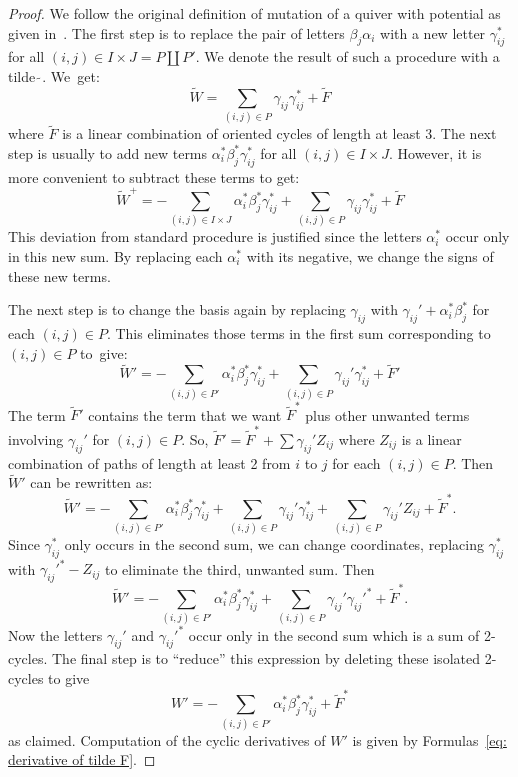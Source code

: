 \documentclass[10pt]{amsart}
\theoremstyle{definition}
\begin{document}
\begin{proof}
We follow the original definition of mutation of a quiver with potential as given in~\cite{DWZ1}. The first step is to replace the pair of letters $\beta_j\alpha_i$ with a new letter $\gamma_{ij}^\ast$ for all $(i,j)\in I\times J=P\coprod P'$. We denote the result of such a procedure with a tilde $\widetilde\,$. We~get:
\[
	\widetilde W= \sum_{(i,j)\in P} \gamma_{ij}\gamma_{ij}^\ast + \widetilde F
\]
where $\widetilde F$ is a linear combination of oriented cycles of length at least 3. The next step is usually to add new terms $\alpha_i^\ast\beta_j^\ast\gamma_{ij}^\ast$ for all $(i,j)\in I\times J$. However, it is more convenient to subtract these terms to get:
\[
	\widetilde W^+=-\sum_{(i,j)\in I\times J} \alpha_i^\ast\beta_j^\ast\gamma_{ij}^\ast+ \sum_{(i,j)\in P} \gamma_{ij}\gamma_{ij}^\ast + \widetilde F
\]
This deviation from standard procedure is justified since the letters $\alpha_i^\ast$ occur only in this new sum. By replacing each $\alpha_i^\ast$ with its negative, we change the signs of these new terms.

The next step is to change the basis again by replacing $\gamma_{ij}$ with $\gamma_{ij}'+\alpha_i^\ast\beta_j^\ast$ for each $(i,j)\in P$. This eliminates those terms in the first sum corresponding to $(i,j)\in P$ to~give:
\[
	\widetilde W'=-\sum_{(i,j)\in P'} \alpha_i^\ast\beta_j^\ast\gamma_{ij}^\ast+ \sum_{(i,j)\in P} \gamma_{ij}'\gamma_{ij}^\ast + \widetilde F'
\]
The term $\widetilde F'$ contains the term that we want $\widetilde F^\ast$ plus other unwanted terms involving $\gamma_{ij}'$ for $(i,j)\in P$. So, $\widetilde F'=\widetilde F^\ast+\sum \gamma_{ij}'Z_{ij}$ where $Z_{ij}$ is a linear combination of paths of length at least 2 from $i$ to $j$ for each $(i,j)\in P$. Then $\widetilde W'$ can be rewritten as:
\[
	\widetilde W'=-\sum_{(i,j)\in P'} \alpha_i^\ast\beta_j^\ast\gamma_{ij}^\ast+ \sum_{(i,j)\in P} \gamma_{ij}'\gamma_{ij}^\ast+\sum_{(i,j)\in P} \gamma_{ij}'Z_{ij} + \widetilde F^\ast.
\]
Since $\gamma_{ij}^\ast$ only occurs in the second sum, we can change coordinates, replacing $\gamma_{ij}^\ast$ with $\gamma_{ij}'^{\ast}-Z_{ij}$ to eliminate the third, unwanted sum. Then
\[
	\widetilde W'=-\sum_{(i,j)\in P'} \alpha_i^\ast\beta_j^\ast\gamma_{ij}^\ast+ \sum_{(i,j)\in P} \gamma_{ij}'\gamma_{ij}'^\ast+ \widetilde F^\ast.
\]
Now the letters $\gamma_{ij}'$ and $\gamma_{ij}'^\ast$ occur only in the second sum which is a sum of 2-cycles. The final step is to ``reduce'' this expression by deleting these isolated 2-cycles to give
\[
	 W'=-\sum_{(i,j)\in P'} \alpha_i^\ast\beta_j^\ast\gamma_{ij}^\ast+  \widetilde F^\ast
\]
as claimed. Computation of the cyclic derivatives of $W'$ is given by Formulas~\ref{eq: derivative of tilde F}.
\end{proof}
\end{document}
